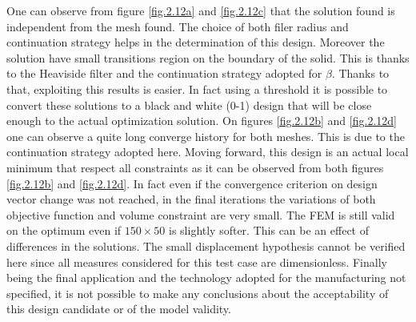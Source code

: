      One can observe from figure \ref{fig.2.12a} and \ref{fig.2.12c} that the solution found is independent from the mesh found. The choice of both filer radius and continuation strategy helps in the determination of this design. Moreover the solution have small transitions region on the boundary of the solid. This is thanks to the Heaviside filter and the continuation strategy adopted for $\beta$. Thanks to that, exploiting this results is easier. In fact using a threshold it is possible to convert these solutions to a black and white (0-1) design that will be close enough to the actual optimization solution.  On figures \ref{fig.2.12b} and \ref{fig.2.12d} one can observe a quite long converge history for both meshes. This is due to the continuation strategy adopted here. Moving forward, this design is an actual local minimum that respect all constraints as it can be observed from both figures \ref{fig.2.12b} and \ref{fig.2.12d}. In fact even if the convergence criterion on design vector change was not reached, in the final iterations the variations of both objective function and volume constraint are very small. The FEM is still valid on the optimum even if $150\times50$ is slightly softer. This can be an effect of differences in the solutions.
      The small displacement hypothesis cannot be verified here since all measures considered for this test case are dimensionless. Finally being the final application and the technology adopted for the manufacturing not specified, it is not possible to make any conclusions about the acceptability of this design candidate or of the model validity.
     \clearpage

